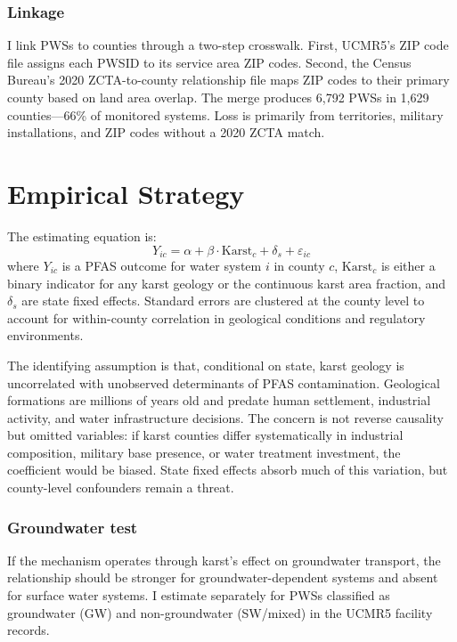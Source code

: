 \documentclass[12pt]{article}
\begin{document}
\subsubsection*{Linkage} I link PWSs to counties through a two-step crosswalk. First, UCMR5's ZIP code file assigns each PWSID to its service area ZIP codes. Second, the Census Bureau's 2020 ZCTA-to-county relationship file maps ZIP codes to their primary county based on land area overlap. The merge produces 6,792 PWSs in 1,629 counties---66\% of monitored systems. Loss is primarily from territories, military installations, and ZIP codes without a 2020 ZCTA match.

\section{Empirical Strategy}

The estimating equation is:
\begin{equation}
Y_{ic} = \alpha + \beta \cdot \text{Karst}_c + \delta_s + \varepsilon_{ic}
\label{eq:main}
\end{equation}
where $Y_{ic}$ is a PFAS outcome for water system $i$ in county $c$, $\text{Karst}_c$ is either a binary indicator for any karst geology or the continuous karst area fraction, and $\delta_s$ are state fixed effects. Standard errors are clustered at the county level to account for within-county correlation in geological conditions and regulatory environments.

The identifying assumption is that, conditional on state, karst geology is uncorrelated with unobserved determinants of PFAS contamination. Geological formations are millions of years old and predate human settlement, industrial activity, and water infrastructure decisions. The concern is not reverse causality but omitted variables: if karst counties differ systematically in industrial composition, military base presence, or water treatment investment, the coefficient would be biased. State fixed effects absorb much of this variation, but county-level confounders remain a threat.

\subsubsection*{Groundwater test} If the mechanism operates through karst's effect on groundwater transport, the relationship should be stronger for groundwater-dependent systems and absent for surface water systems. I estimate  separately for PWSs classified as groundwater (GW) and non-groundwater (SW/mixed) in the UCMR5 facility records.
\end{document}
